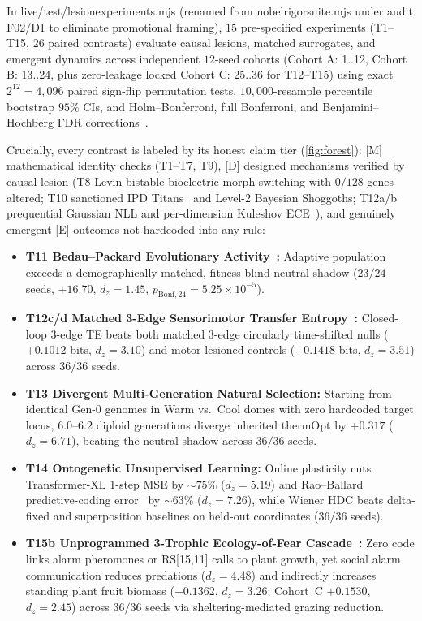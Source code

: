 \documentclass[11pt,a4paper]{article}
\numberwithin{equation}{section}
\theoremstyle{plain}
\theoremstyle{definition}
\theoremstyle{remark}
\newcommand{\code}[1]{{\ttfamily\footnotesize\def\_{\textunderscore\penalty0\hskip0pt}#1}}
\begin{document}
In \code{live/test/lesion\_experiments.mjs} (renamed from \code{nobel\_rigor\_suite.mjs} under audit \code{F02/D1} to eliminate promotional framing), $15$ pre-specified experiments (\code{T1--T15}, $26$ paired contrasts) evaluate causal lesions, matched surrogates, and emergent dynamics across independent $12$-seed cohorts (\code{Cohort A: 1..12}, \code{Cohort B: 13..24}, plus zero-leakage locked \code{Cohort C: 25..36} for \code{T12--T15}) using exact $2^{12}=4{,}096$ paired sign-flip permutation tests, $10{,}000$-resample percentile bootstrap $95\%$ CIs, and Holm--Bonferroni, full Bonferroni, and Benjamini--Hochberg FDR corrections~\cite{Holm1979}.

Crucially, every contrast is labeled by its honest claim tier (\cref{fig:forest}): \code{[M]} mathematical identity checks (\code{T1--T7, T9}), \code{[D]} designed mechanisms verified by causal lesion (\code{T8} Levin bistable bioelectric morph switching with $0/128$ genes altered; \code{T10} sanctioned IPD Titans~\cite{PressDyson2012} and Level-2 Bayesian Shoggoths; \code{T12a/b} prequential Gaussian NLL and per-dimension Kuleshov ECE~\cite{Kuleshov2018}), and genuinely emergent \code{[E]} outcomes not hardcoded into any rule:
\begin{itemize}[leftmargin=1.6em,itemsep=1pt]
  \item \textbf{\code{T11} Bedau--Packard Evolutionary Activity~\cite{BedauPackard1998}:} Adaptive population exceeds a demographically matched, fitness-blind neutral shadow ($23/24$ seeds, $+16.70$, $d_z = 1.45$, $p_{\mathrm{Bonf},24} = 5.25\times 10^{-5}$).
  \item \textbf{\code{T12c/d} Matched 3-Edge Sensorimotor Transfer Entropy~\cite{Schreiber2000}:} Closed-loop 3-edge TE beats both matched 3-edge circularly time-shifted nulls ($+0.1012$ bits, $d_z = 3.10$) and motor-lesioned controls ($+0.1418$ bits, $d_z = 3.51$) across $36/36$ seeds.
  \item \textbf{\code{T13} Divergent Multi-Generation Natural Selection:} Starting from identical Gen-$0$ genomes in Warm vs.\ Cool domes with zero hardcoded target locus, $6.0$--$6.2$ diploid generations diverge inherited \code{thermOpt} by $+0.317$ ($d_z = 6.71$), beating the neutral shadow across $36/36$ seeds.
  \item \textbf{\code{T14} Ontogenetic Unsupervised Learning:} Online plasticity cuts Transformer-XL 1-step MSE by $\sim 75\%$ ($d_z=5.19$) and Rao--Ballard predictive-coding error~\cite{RaoBallard1999} by $\sim 63\%$ ($d_z=7.26$), while Wiener HDC beats delta-fixed and superposition baselines on held-out coordinates ($36/36$ seeds).
  \item \textbf{\code{T15b} Unprogrammed 3-Trophic Ecology-of-Fear Cascade~\cite{Schmitz1997,Brown1999}:} Zero code links alarm pheromones or \code{RS[15,11]} calls to plant growth, yet social alarm communication reduces predations ($d_z=4.48$) and indirectly increases standing plant fruit biomass ($+0.1362$, $d_z=3.26$; Cohort~C $+0.1530$, $d_z=2.45$) across $36/36$ seeds via sheltering-mediated grazing reduction.
\end{itemize}
\end{document}
